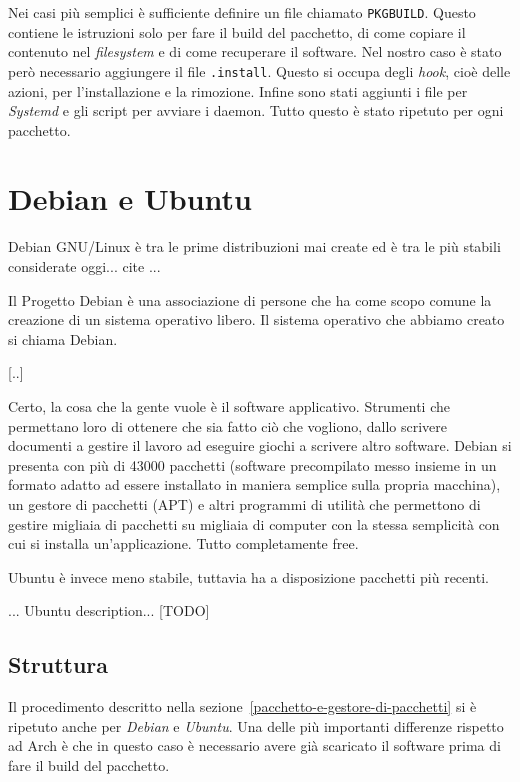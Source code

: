 \documentclass[10pt,titlepage,twoside,a4paper]{report}
\begin{document}
Nei casi più semplici è sufficiente definire un file chiamato 
\texttt{PKGBUILD}. Questo contiene le istruzioni solo per fare il build del 
pacchetto, di come copiare il contenuto nel \emph{filesystem} e di come 
recuperare il software. Nel nostro caso è stato però necessario aggiungere
il file \texttt{.install}. Questo si occupa degli \emph{hook}, cioè delle 
azioni, per l'installazione e la rimozione. Infine sono stati aggiunti i file 
per \emph{Systemd} e gli script per avviare i daemon. Tutto questo è stato 
ripetuto per ogni pacchetto.


\section{Debian e Ubuntu}
Debian GNU/Linux è tra le prime distribuzioni mai 
create\cite{debianFirstDistro} ed 
è tra le più stabili considerate oggi... cite ...
 
\cite{debian}
\begin{displayquote}
Il Progetto Debian è una associazione di persone che ha come scopo comune la 
creazione di un sistema operativo libero. Il sistema operativo che abbiamo 
creato si chiama Debian.

[..]

Certo, la cosa che la gente vuole è il software applicativo. Strumenti che 
permettano loro di ottenere che sia fatto ciò che vogliono, dallo scrivere 
documenti a gestire il lavoro ad eseguire giochi a scrivere altro software. 
Debian si presenta con più di 43000 pacchetti (software precompilato messo 
insieme in un formato adatto ad essere installato in maniera semplice sulla 
propria macchina), un gestore di pacchetti (APT) e altri programmi di utilità 
che permettono di gestire migliaia di pacchetti su migliaia di computer con la 
stessa semplicità con cui si installa un'applicazione. Tutto completamente 
free. 
\end{displayquote}

Ubuntu è invece meno stabile, tuttavia ha a
disposizione pacchetti più recenti.

... Ubuntu description... [TODO]

\subsection{Struttura}
Il procedimento descritto nella sezione~\ref{pacchetto-e-gestore-di-pacchetti}
si è ripetuto anche per \emph{Debian} e \emph{Ubuntu}. Una delle più 
importanti differenze rispetto ad Arch è che in questo caso è necessario 
avere già scaricato il software prima di fare il build del pacchetto.
\end{document}
